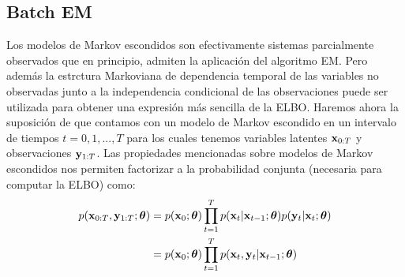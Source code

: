 \subsection{Batch EM} \label{sec:batchEM}

Los modelos de Markov escondidos son efectivamente sistemas parcialmente observados que en principio, admiten la aplicación del algoritmo EM. Pero además la estrctura Markoviana de dependencia temporal de las variables no observadas junto a la independencia condicional de las observaciones puede ser utilizada para obtener una expresión más sencilla de la ELBO. Haremos ahora la suposición de que contamos con un modelo de Markov escondido en un intervalo de tiempos $t = 0, 1, ..., T$ para los cuales tenemos variables latentes $\mathbf{x}_{0:T}$ y observaciones $\mathbf{y}_{1:T}$. Las propiedades mencionadas sobre modelos de Markov escondidos nos permiten factorizar a la probabilidad conjunta (necesaria para computar la ELBO) como:
\begin{align}
    p(\mathbf{x}_{0:T}, \mathbf{y}_{1:T} ; \mbox{\boldmath$ \theta $}) &= p(\mathbf{x}_0 ; \mbox{\boldmath$ \theta $}) \prod_{t=1}^T p(\mathbf{x}_t | \mathbf{x}_{t-1} ; \mbox{\boldmath$ \theta $}) p(\mathbf{y}_t | \mathbf{x}_t ; \mbox{\boldmath$ \theta $}) \\
    &= p(\mathbf{x}_0 ; \mbox{\boldmath$ \theta $}) \prod_{t=1}^T p(\mathbf{x}_t, \mathbf{y}_t | \mathbf{x}_{t-1} ; \mbox{\boldmath$ \theta $})
\end{align}

